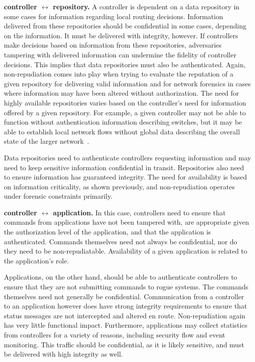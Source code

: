 \documentclass[10pt,conference]{IEEEtran}
\begin{document}
\noindent
{\bf controller $\leftrightarrow$ repository.}
A controller is dependent on a data repository in some cases for information regarding local routing decisions.  Information delivered from these repositories should be confidential in some cases, depending on the information.  It must be delivered with integrity, however.  If controllers make decisions based on information from these repositories, adversaries tampering with delivered information can undermine the fidelity of controller decisions.  This implies that data repositories must also be authenticated.  Again, non-repudiation comes into play when trying to evaluate the reputation of a given repository for delivering valid information and for network forensics in cases where information may have been altered without authorization.  The need for highly available repositories varies based on the controller's need for information offered by a given repository.  For example, a given controller may not be able to function without authentication information describing switches, but it may be able to establish local network flows without global data describing the overall state of the larger network~\cite{ScSu:13}.

Data repositories need to authenticate controllers requesting information and may need to keep sensitive information confidential in transit.  Repositories also need to ensure information has guaranteed integrity.  The need for availability is based on information criticality, as shown previously, and non-repudiation operates under forensic constraints primarily.

\noindent
{\bf controller $\leftrightarrow$ application.}
In this case, controllers need to ensure that commands from applications have not been tampered with, are appropriate given the authorization level of the application, and that the application is authenticated.  Commands themselves need not always be confidential, nor do they need to be non-repudiatable.  Availability of a given application is related to the application's role.

Applications, on the other hand, should be able to authenticate controllers to ensure that they are not submitting commands to rogue systems.  The commands themselves need not generally be confidential.  Communication from a controller to an application however does have strong integrity requirements to ensure that status messages are not intercepted and altered en route.  Non-repudiation again has very little functional impact.  Furthermore, applications may collect statistics from controllers for a variety of reasons, including security flow and event monitoring.  This traffic should be confidential, as it is likely sensitive, and must be delivered with high integrity as well.
\end{document}
